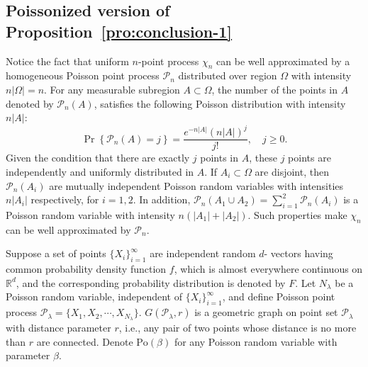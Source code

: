 \documentclass[preprint,12pt]{elsarticle}
\begin{document}
\subsection{Poissonized version of Proposition~\ref{pro:conclusion-1}}

Notice the fact that uniform $n$-point process  $\chi_n$ can be well approximated by a homogeneous Poisson point process $\mathcal{P}_n$ distributed over region $\Omega$ with intensity $n|\Omega|=n$. For any measurable subregion $A\subset\Omega$,
the number of the points in $A$  denoted by $\mathcal{P}_n(A)$, satisfies the following
Poisson distribution with intensity $n|A|$:
$$
   \Pr\left\{\mathcal{P}_n(A)=j\right\}=\frac{e^{-n|A|}(n|A|)^j}{j!},\quad j\geq0.
$$
Given the condition that there are exactly $j$ points in $A$,   these $j$ points are independently and uniformly distributed in $A$.
If $A_i\subset \Omega$ are disjoint, then  $\mathcal{P}_n(A_i)$ are mutually independent Poisson random variables with intensities
$n|A_i|$ respectively, for $i=1,2$. In addition, $\mathcal{P}_n (A_1\cup A_2)=\sum_{i=1}^2\mathcal{P}_n(A_i)$ is a Poisson random variable with intensity $n(|A_1|+|A_2|)$. Such properties make $\chi_n$ can be well approximated by $\mathcal{P}_n$.







Suppose a set of points $\{X_i\}_{i=1}^\infty$ are independent random $d$- vectors having common probability density function $f$, which is almost everywhere continuous on $\mathbb{R}^d$, and the corresponding probability distribution is denoted by $F$. Let
$N_\lambda$ be a Poisson random variable, independent of $\{X_i\}_{i=1}^\infty$, and define Poisson point process
$\mathcal{P}_\lambda=\{X_1,X_2,\cdots,X_{N_\lambda}\}$. $G(\mathcal{P}_\lambda, r)$ is a geometric graph on point set
$\mathcal{P}_\lambda$ with distance parameter $r$, i.e., any pair of two points whose distance is no more than $r$ are connected.
Denote $\mathrm{Po}(\beta)$ for any Poisson random variable with parameter $\beta$.
\end{document}
